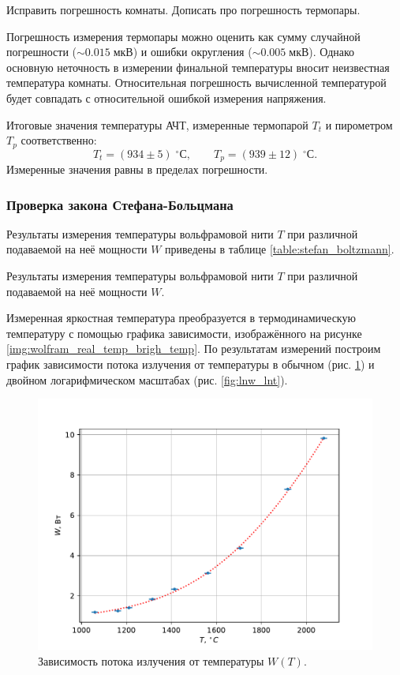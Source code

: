 \documentclass[10pt,a4paper]{article}
\newcommand{\cels}{\; ^\circ С}
\begin{document}
\begin{multicols}{2}
	\Huge 
	\color{red}
	Исправить погрешность комнаты. Дописать про погрешность термопары.
	\color{black}
	\normalsize	
	
	Погрешность измерения термопары можно оценить как сумму случайной погрешности ($\sim0.015\;\text{мкВ}$) и ошибки округления ($\sim0.005\;\text{мкВ}$). Однако основную неточность в измерении финальной температуры вносит неизвестная температура комнаты. Относительная погрешность вычисленной температурой будет совпадать с относительной ошибкой измерения напряжения. 
	
	Итоговые значения температуры АЧТ, измеренные термопарой $T_t$ и пирометром $T_p$ соответственно:
	$$
	T_t = (934 \pm 5) \cels,\qquad T_p = (939 \pm 12) \cels.
	$$	
	Измеренные значения равны в пределах погрешности.
	
	\subsubsection*{Проверка закона Стефана-Больцмана}
	
	Результаты измерения температуры вольфрамовой нити $T$ при различной подаваемой на неё мощности $W$ приведены в таблице \ref{table:stefan_boltzmann}.
	
	\begin{table}[H]
		\addtolength{\tabcolsep}{-4pt}
		\footnotesize
		
		\label{table:stefan_boltzmann}
		\caption{Результаты измерения температуры вольфрамовой нити $T$ при различной подаваемой на неё мощности $W$.}
	\end{table}
	
	Измеренная яркостная температура преобразуется в термодинамическую температуру с помощью графика зависимости, изображённого на рисунке \ref{img:wolfram_real_temp_brigh_temp}. По результатам измерений построим график зависимости потока излучения от температуры в обычном (рис. \ref{fig:wt}) и двойном логарифмическом масштабах (рис. \ref{fig:lnw_lnt}).
	
	\begin{figure}[H]
		\includegraphics[width=1\textwidth]{gen/fig-wt.pdf}
		\caption{Зависимость потока излучения от температуры $W(T)$.}
		\label{fig:wt}
	\end{figure}


\end{multicols}
\end{document}
